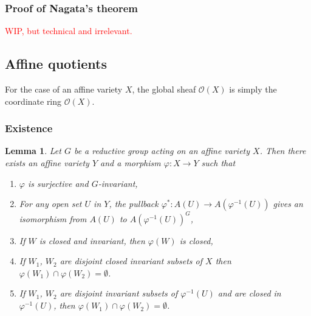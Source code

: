 \documentclass[12pt]{article}
\newtheorem{lemma}{Lemma}[section]
\theoremstyle{remark}
\theoremstyle{definition}
\begin{document}
    \subsubsection{Proof of Nagata's theorem}
    \textcolor{red}{WIP, but technical and irrelevant.}
    \subsection{Affine quotients}
    For the case of an affine variety $X$, the global sheaf $\mathcal O(X)$ is simply the coordinate ring $\mathcal O(X)$.
    \subsubsection{Existence}
    \begin{lemma}
        Let $G$ be a reductive group acting on an affine variety $X$. Then there exists an affine variety $Y$ and a morphism $\varphi:X\to Y$ such that 
        \begin{enumerate}[\normalfont(i)]
            \item $\varphi$ is surjective and $G$-invariant,
            \item For any open set $U$ in $Y$, the pullback $\varphi^*:A(U)\to A(\varphi^{-1}(U))$ gives an isomorphism from $A(U)$ to $A(\varphi^{-1}(U))^G$,
            \item If $W$ is closed and invariant, then $\varphi(W)$ is closed,
            \item If $W_1$, $W_2$ are disjoint closed invariant subsets of $X$ then $\varphi(W_1)\cap\varphi(W_2)=\emptyset$.
            \item If $W_1$, $W_2$ are disjoint invariant subsets of $\varphi^{-1}(U)$ and are closed in $\varphi^{-1}(U)$, then $\varphi(W_1)\cap\varphi(W_2)=\emptyset$.
        \end{enumerate}
    \end{lemma}
\end{document}
